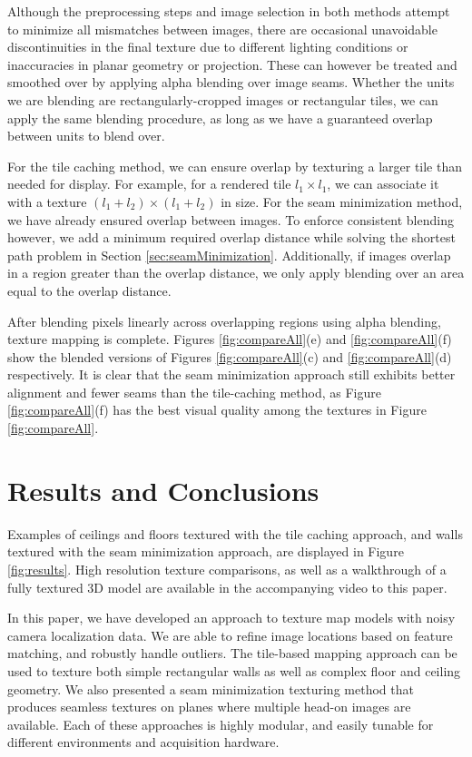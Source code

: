 \message{ !name(oldpaper.tex)}\documentclass[10pt,twocolumn,letterpaper]{article}
\begin{document}
Although the preprocessing steps and image selection in both methods
attempt to minimize all mismatches between images, there are
occasional unavoidable discontinuities in the final texture due to
different lighting conditions or inaccuracies in planar geometry or
projection. These can however be treated and smoothed over by applying
alpha blending over image seams.  Whether the units we are blending
are rectangularly-cropped images or rectangular tiles, we can apply
the same blending procedure, as long as we have a guaranteed overlap
between units to blend over.

For the tile caching method, we can ensure overlap by texturing a
larger tile than needed for display. For example, for a rendered tile
$l_1 \times l_1$, we can associate it with a texture $(l_1 + l_2)
\times (l_1 + l_2)$ in size. For the seam minimization method, we have
already ensured overlap between images. To enforce consistent blending
however, we add a minimum required overlap distance while solving the
shortest path problem in Section
\ref{sec:seamMinimization}. Additionally, if images overlap in a
region greater than the overlap distance, we only apply blending over
an area equal to the overlap distance.

After blending pixels linearly across overlapping regions using alpha
blending, texture mapping is complete. Figures \ref{fig:compareAll}(e)
and \ref{fig:compareAll}(f) show the blended versions of Figures
\ref{fig:compareAll}(c) and \ref{fig:compareAll}(d) respectively. It
is clear that the seam minimization approach still exhibits better
alignment and fewer seams than the tile-caching method, as Figure
\ref{fig:compareAll}(f) has the best visual quality among the textures
in Figure \ref{fig:compareAll}.



\section{Results and Conclusions}
\label{sec:resultsAndConclusions}
Examples of ceilings and floors textured with the tile caching
approach, and walls textured with the seam minimization approach, are
displayed in Figure \ref{fig:results}. High resolution texture
comparisons, as well as a walkthrough of a fully textured 3D model are
available in the accompanying video to this paper.

In this paper, we have developed an approach to texture map models
with noisy camera localization data. We are able to refine image
locations based on feature matching, and robustly handle outliers. The
tile-based mapping approach can be used to texture both simple
rectangular walls as well as complex floor and ceiling geometry. We
also presented a seam minimization texturing method that produces
seamless textures on planes where multiple head-on images are
available. Each of these approaches is highly modular, and easily
tunable for different environments and acquisition hardware.
\end{document}
